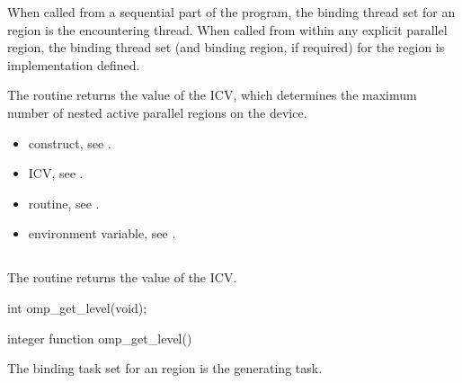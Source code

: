 \binding
When called from a sequential part of the program, the binding thread set for an
 region is the encountering thread. When called
from within any explicit parallel region, the binding thread set (and binding region, if
required) for the  region is implementation defined.

\effect
The  routine returns the value of the  ICV,
which determines the maximum number of nested active parallel regions
on the device.

\crossreferences
\begin{itemize}
\item {} construct, see
.

\item {} ICV, see
.

\item {} routine, see
.

\item {} environment variable, see
.
\end{itemize}








\subsection{}
\label{subsec:omp_get_level}
\summary
The  routine returns the value of the  ICV.

\format
\begin{ccppspecific}
\begin{ompcFunction}
int omp_get_level(void);
\end{ompcFunction}
\end{ccppspecific}

\begin{fortranspecific}
\begin{ompfFunction}
integer function omp_get_level()
\end{ompfFunction}
\end{fortranspecific}

\binding
The binding task set for an  region is the generating task.

